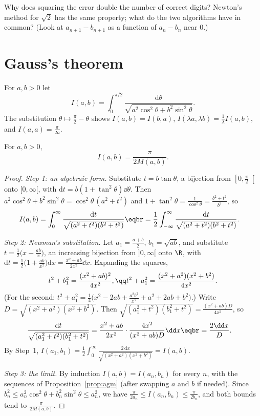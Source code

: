 \begin{think}
Why does squaring the error double the number of correct digits? Newton's method for $\sqrt2$ has the same property; what do the two
algorithms have in common? (Look at $a_{n+1}-b_{n+1}$ as a function of $a_n-b_n$ near $0$.)
\end{think}

\section{Gauss's theorem}

For $a,b>0$ let
\[
I(a,b)=\int_0^{\pi/2}\frac{\mathrm d\theta}{\sqrt{a^2\cos^2\theta+b^2\sin^2\theta}}.
\]
The substitution $\theta\mapsto\frac\pi2-\theta$ shows $I(a,b)=I(b,a)$, $I(\lambda a,\lambda b)=\frac1\lambda I(a,b)$, and $I(a,a)=\frac\pi{2a}$.

\begin{theorem}[Gauss, 1799]\label{thm:gaussagm}
For $a,b>0$,
\[
I(a,b)=\frac\pi{2M(a,b)}.
\]
\end{theorem}
\begin{proof}
\emph{Step 1: an algebraic form.} Substitute $t=b\tan\theta$, a bijection from $\left[0,\frac\pi2\right[$ onto $[0,\infty[$, with $\mathrm dt=b(1+\tan^2\theta)\dd\theta$.
Then $a^2\cos^2\theta+b^2\sin^2\theta=\cos^2\theta\,(a^2+t^2)$ and $1+\tan^2\theta=\frac1{\cos^2\theta}=\frac{b^2+t^2}{b^2}$, so
\[
\begin{aligned}I(a,b)&=\int_0^\infty\frac{\mathrm dt}{\sqrt{(a^2+t^2)(b^2+t^2)}}\eqbr=\frac12\int_{-\infty}^{\infty}\frac{\mathrm dt}{\sqrt{(a^2+t^2)(b^2+t^2)}}.\end{aligned}
\]

\emph{Step 2: Newman's substitution.} Let $a_1=\frac{a+b}2$, $b_1=\sqrt{ab}$, and substitute $t=\frac12\bigl(x-\frac{ab}x\bigr)$, an increasing bijection from $]0,\infty[$
onto $\R$, with $\mathrm dt=\frac12\bigl(1+\frac{ab}{x^2}\bigr)\mathrm dx=\frac{x^2+ab}{2x^2}\dd x$. Expanding the squares,
\[
\begin{gathered}t^2+b_1^2=\frac{(x^2+ab)^2}{4x^2},\qq t^2+a_1^2=\frac{(x^2+a^2)(x^2+b^2)}{4x^2}.\end{gathered}
\]
(For the second: $t^2+a_1^2=\frac14\bigl(x^2-2ab+\frac{a^2b^2}{x^2}+a^2+2ab+b^2\bigr)$.) Write $D=\sqrt{(x^2+a^2)(x^2+b^2)}$. Then
$\sqrt{(a_1^2+t^2)(b_1^2+t^2)}=\frac{(x^2+ab)D}{4x^2}$, so
\[
\begin{aligned}\frac{\mathrm dt}{\sqrt{(a_1^2+t^2)(b_1^2+t^2)}}&=\frac{x^2+ab}{2x^2}\cdot\frac{4x^2}{(x^2+ab)D}\dd x\eqbr=\frac{2\dd x}D.\end{aligned}
\]
By Step~1, $I(a_1,b_1)=\frac12\int_0^\infty\frac{2\,\mathrm dx}{\sqrt{(x^2+a^2)(x^2+b^2)}}=I(a,b)$.

\emph{Step 3: the limit.} By induction $I(a,b)=I(a_n,b_n)$ for every $n$, with the sequences of Proposition~\ref{prop:agm} (after swapping $a$ and $b$ if
needed). Since $b_n^2\le a_n^2\cos^2\theta+b_n^2\sin^2\theta\le a_n^2$, we have $\frac\pi{2a_n}\le I(a_n,b_n)\le\frac\pi{2b_n}$, and both bounds tend to $\frac\pi{2M(a,b)}$.
\end{proof}

